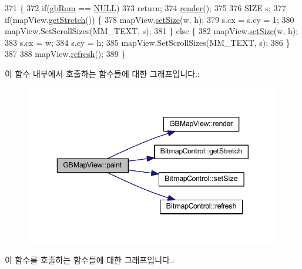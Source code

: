 \begin{DoxyCode}
371 \{
372   \textcolor{keywordflow}{if}(\mbox{\hyperlink{gb_globals_8cpp_ae4f6bd8162474dbcfdbc54c36d7f5695}{gbRom}} == \mbox{\hyperlink{getopt1_8c_a070d2ce7b6bb7e5c05602aa8c308d0c4}{NULL}})
373     \textcolor{keywordflow}{return};
374   \mbox{\hyperlink{class_g_b_map_view_a48aeac68f689682206749e933513b98e}{render}}();
375   
376   SIZE s;
377   \textcolor{keywordflow}{if}(mapView.\mbox{\hyperlink{class_bitmap_control_a1d3cff9a3b57dd7558d678177dcf4b5c}{getStretch}}()) \{
378     mapView.\mbox{\hyperlink{class_bitmap_control_a421004fe6ba01329dd69259396592d1f}{setSize}}(w, h);
379     s.cx = s.cy = 1;
380     mapView.SetScrollSizes(MM\_TEXT, s);
381   \} \textcolor{keywordflow}{else} \{
382     mapView.\mbox{\hyperlink{class_bitmap_control_a421004fe6ba01329dd69259396592d1f}{setSize}}(w, h);
383     s.cx = w;
384     s.cy = h;
385     mapView.SetScrollSizes(MM\_TEXT, s);
386   \}
387 
388   mapView.\mbox{\hyperlink{class_bitmap_control_acf061a1e9a4cad90ad2827c14f79caa2}{refresh}}();
389 \}
\end{DoxyCode}
이 함수 내부에서 호출하는 함수들에 대한 그래프입니다.\+:
\nopagebreak
\begin{figure}[H]
\begin{center}
\leavevmode
\includegraphics[width=343pt]{class_g_b_map_view_a42de669273417186b01ca6f8d06eb347_cgraph}
\end{center}
\end{figure}
이 함수를 호출하는 함수들에 대한 그래프입니다.\+:
\nopagebreak
